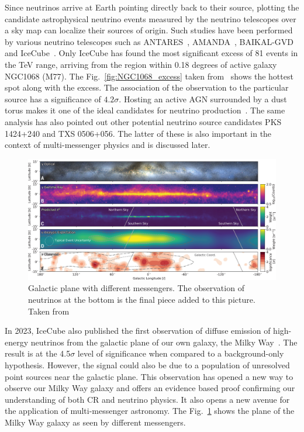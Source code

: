   Since neutrinos arrive at Earth pointing directly back to their source, plotting the candidate astrophysical neutrino events measured by the neutrino telescopes over a sky map can localize their sources of origin. Such studies have been performed by various neutrino telescopes such as ANTARES~\cite{Albert_2021}, AMANDA~\cite{Abbasi_2009_Amanda}, BAIKAL-GVD~\cite{Allakhverdyan_2023} and IceCube~\cite{Icecube_2022}. Only IceCube has found the most significant excess of 81 events in the TeV range, arriving from the region within 0.18 degrees of active galaxy NGC1068 (M77). The Fig.~\ref{fig:NGC1068_excess} taken from~\cite{Icecube_2022} shows the hottest spot along with the excess. The association of the observation to the particular source has a significance of $4.2\sigma$. Hosting an active AGN surrounded by a dust torus makes it one of the ideal candidates for neutrino production~\cite{eichler1979high,berezinsky1981high}. The same analysis has also pointed out other potential neutrino source candidates PKS 1424+240 and TXS 0506+056. The latter of these is also important in the context of multi-messenger physics and is discussed later. 

  \begin{figure}[t!]
    \centering
    \includegraphics[width=14.5cm]{thesis_figures/CRnNu/science-adc9818-f1.jpg}
    \caption{Galactic plane with different messengers. The observation of neutrinos at the bottom is the final piece added to this picture. Taken from~\cite{Galactic_plane_nu_2023}}
    \label{fig:Galactic_plane_nu_messengers}
  \end{figure}

  In 2023, IceCube also published the first observation of diffuse emission of high-energy neutrinos from the galactic plane of our own galaxy, the Milky Way~\cite{Galactic_plane_nu_2023}. The result is at the 4.5$\sigma$ level of significance when compared to a background-only hypothesis. However, the signal could also be due to a population of unresolved point sources near the galactic plane. This observation has opened a new way to observe our Milky Way galaxy and offers an evidence based proof confirming our understanding of both \gls{CR} and neutrino physics. It also opens a new avenue for the application of multi-messenger astronomy. The Fig.~\ref{fig:Galactic_plane_nu_messengers} shows the plane of the Milky Way galaxy as seen by different messengers.
  
